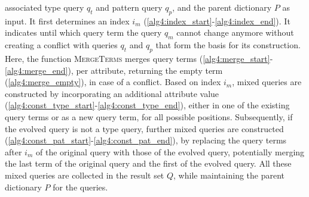 associated type query $q_t$ and pattern query $q_p$, and the parent
dictionary $P$ as input.
It first determines an index ${i_m}$
(\autoref{alg4:index_start}-\ref{alg4:index_end}). It indicates until which
query term the query $q_m$ cannot change anymore without creating a conflict
with queries $q_t$ and $q_p$ that form the basis for its construction. Here,
the function \textsc{MergeTerms} merges query terms
(\autoref{alg4:merge_start}-\ref{alg4:merge_end}), per attribute, returning
the empty term (\autoref{alg4:merge_empty}), in case of a conflict.
Based on index ${i_m}$, mixed queries are constructed by incorporating an
additional attribute value
(\autoref{alg4:const_type_start}-\ref{alg4:const_type_end}), either in one
of the existing query terms or as a new query term, for all possible
positions. Subsequently, if the evolved query is not a type query, further
mixed queries are constructed
(\autoref{alg4:const_pat_start}-\ref{alg4:const_pat_end}), by replacing the
query terms after ${i_m}$ of the original query with those of the evolved
query, potentially merging the last term of the original query and the first
of the evolved query. All these mixed queries are collected in the result
set $Q$, while maintaining the parent dictionary $P$ for the queries.
